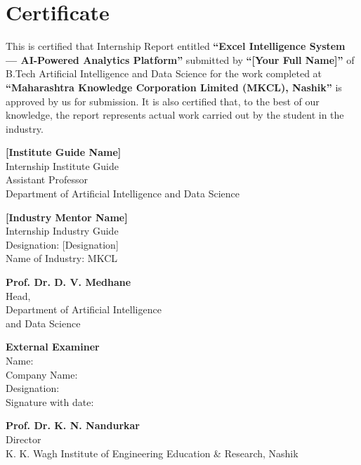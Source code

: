 \documentclass[12pt,a4paper]{report}
\begin{document}
\chapter*{Certificate}

This is certified that Internship Report entitled \textbf{``Excel Intelligence System --- AI-Powered Analytics Platform''} submitted by \textbf{``[Your Full Name]''} of B.Tech Artificial Intelligence and Data Science for the work completed at \textbf{``Maharashtra Knowledge Corporation Limited (MKCL), Nashik''} is approved by us for submission. It is also certified that, to the best of our knowledge, the report represents actual work carried out by the student in the industry.

\vspace{3cm}

\begin{minipage}[t]{0.45\textwidth}
\vspace{0.3cm}
\textbf{[Institute Guide Name]}\\
Internship Institute Guide\\
Assistant Professor\\
Department of Artificial Intelligence and Data Science
\end{minipage}
\hfill
\begin{minipage}[t]{0.45\textwidth}
\textbf{[Industry Mentor Name]}\\
Internship Industry Guide\\
Designation: [Designation]\\
Name of Industry: MKCL
\end{minipage}

\vspace{3cm}

\begin{minipage}[t]{0.45\textwidth}
\textbf{Prof. Dr. D. V. Medhane}\\
Head,\\
Department of Artificial Intelligence \\
and Data Science

\vspace{1cm}

\textbf{External Examiner}\\
Name: \underline{\hspace{4cm}}\\
Company Name: \underline{\hspace{4cm}}\\
Designation: \underline{\hspace{4cm}}\\
Signature with date: \underline{}\\
\end{minipage}
\hfill
\begin{minipage}[t]{0.45\textwidth}
\textbf{Prof. Dr. K. N. Nandurkar}\\
Director\\
K. K. Wagh Institute of Engineering Education \& Research, Nashik
\end{minipage}
\end{document}
